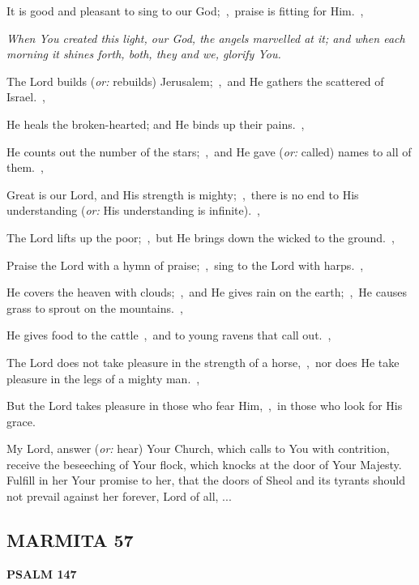 \documentclass[12pt,twoside,a5paper]{article}
\newcommand{\marmita}[1]{\subsection*{MARMITA {#1}}}
\newcommand{\psalm}[1]{\textbf{PSALM {#1}}\nopagebreak}
\newcommand{\qanona}[1]{{\liturgicalhint{Qanona.} \emph{#1}}}
\newcommand{\slota}[1]{\liturgicalhint{Slota.} #1}
\newcommand{\translationoption}[1]{\emph{or:} #1}
\begin{document}
\begin{normalparskip}
  It is good and pleasant to sing to our God;~\sep\ praise is fitting for Him.~\sep

  \qanona{When You created this light, our God, the angels marvelled at it; and when each morning it shines forth, both, they and we, glorify You.}

  The Lord builds (\translationoption{rebuilds}) Jerusalem;~\sep\ and He gathers the scattered of Israel.~\sep

  He heals the broken-hearted; and He binds up their pains.~\sep

  He counts out the number of the stars;~\sep\ and He gave (\translationoption{called}) names to all of them.~\sep

  Great is our Lord, and His strength is mighty;~\sep\ there is no end to His understanding (\translationoption{His understanding is infinite}).~\sep

  The Lord lifts up the poor;~\sep\ but He brings down the wicked to the ground.~\sep

  Praise the Lord with a hymn of praise;~\sep\ sing to the Lord with harps.~\sep

  He covers the heaven with clouds;~\sep\ and He gives rain on the earth;~\sep\ He causes grass to sprout on the mountains.~\sep

  He gives food to the cattle~\sep\ and to young ravens that call out.~\sep

  The Lord does not take pleasure in the strength of a horse,~\sep\ nor does He take pleasure in the legs of a mighty man.~\sep

  But the Lord takes pleasure in those who fear Him,~\sep\ in those who look for His grace.
\end{normalparskip}

\slota{My Lord, answer (\translationoption{hear}) Your Church, which calls to You with contrition, receive the beseeching of Your flock, which knocks at the door of Your Majesty. Fulfill in her Your promise to her, that the doors of Sheol and its tyrants should not prevail against her forever, Lord of all, ...}

\marmita{57}

\psalm{147}
\end{document}
